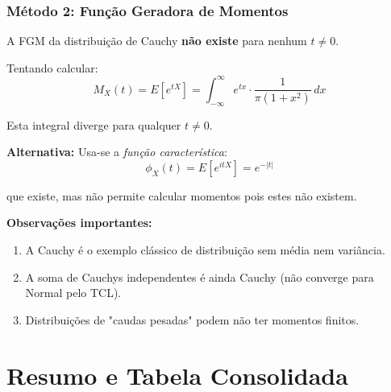 \documentclass[12pt,a4paper]{article}
\theoremstyle{plain}
\theoremstyle{definition}
\theoremstyle{remark}
\begin{document}
\subsubsection{Método 2: Função Geradora de Momentos}

A FGM da distribuição de Cauchy \textbf{não existe} para nenhum \(t \neq 0\). 

Tentando calcular:
\[
M_X(t) = E[e^{tX}] = \int_{-\infty}^{\infty} e^{tx} \cdot \frac{1}{\pi(1+x^2)} \, dx
\]

Esta integral diverge para qualquer \(t \neq 0\).

\textbf{Alternativa:} Usa-se a \emph{função característica}:
\[
\phi_X(t) = E[e^{itX}] = e^{-|t|}
\]

que existe, mas não permite calcular momentos pois estes não existem.

\textbf{Observações importantes:}
\begin{enumerate}
    \item A Cauchy é o exemplo clássico de distribuição sem média nem variância.
    \item A soma de Cauchys independentes é ainda Cauchy (não converge para Normal pelo TCL).
    \item Distribuições de "caudas pesadas" podem não ter momentos finitos.
\end{enumerate}

\newpage
\section{Resumo e Tabela Consolidada}
\end{document}
